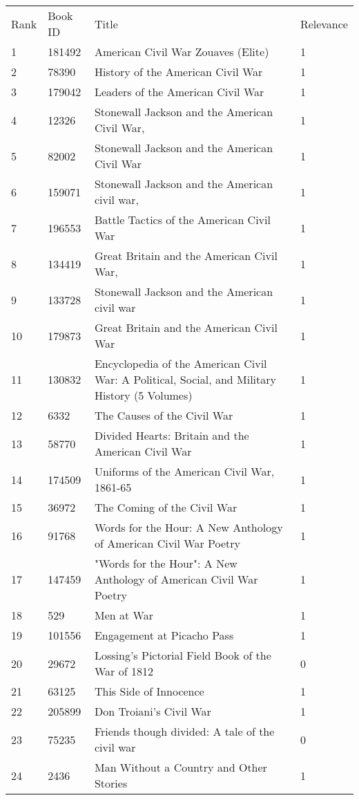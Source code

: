 \begin{tabular}{llll}
\toprule
\midrule
Rank & Book ID & Title & Relevance \\
1 & 181492 & American Civil War Zouaves (Elite) & 1 \\
2 & 78390 & History of the American Civil War & 1 \\
3 & 179042 & Leaders of the American Civil War & 1 \\
4 & 12326 & Stonewall Jackson and the American Civil War, & 1 \\
5 & 82002 & Stonewall Jackson and the American Civil War & 1 \\
6 & 159071 & Stonewall Jackson and the American civil war, & 1 \\
7 & 196553 & Battle Tactics of the American Civil War & 1 \\
8 & 134419 & Great Britain and the American Civil War, & 1 \\
9 & 133728 & Stonewall Jackson and the American civil war & 1 \\
10 & 179873 & Great Britain and the American Civil War & 1 \\
11 & 130832 & Encyclopedia of the American Civil War: A Political, Social, and Military History (5 Volumes) & 1 \\
12 & 6332 & The Causes of the Civil War & 1 \\
13 & 58770 & Divided Hearts: Britain and the American Civil War & 1 \\
14 & 174509 & Uniforms of the American Civil War, 1861-65 & 1 \\
15 & 36972 & The Coming of the Civil War & 1 \\
16 & 91768 & Words for the Hour: A New Anthology of American Civil War Poetry & 1 \\
17 & 147459 & "Words for the Hour": A New Anthology of American Civil War Poetry & 1 \\
18 & 529 & Men at War & 1 \\
19 & 101556 & Engagement at Picacho Pass & 1 \\
20 & 29672 & Lossing's Pictorial Field Book of the War of 1812 & 0 \\
21 & 63125 & This Side of Innocence & 1 \\
22 & 205899 & Don Troiani's Civil War & 1 \\
23 & 75235 & Friends though divided: A tale of the civil war & 0 \\
24 & 2436 & Man Without a Country and Other Stories & 1 \\

\end{tabular}

